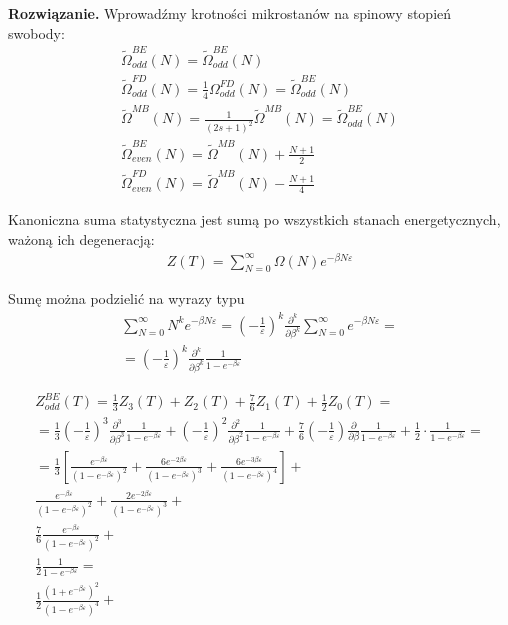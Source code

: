 \documentclass[11pt,a4paper]{article}
\newenvironment{solution}{\vspace{1cm} \par\textbf{Rozwiązanie.} \vspace{1cm}}{}
\begin{document}
\begin{solution}
Wprowadźmy krotności mikrostanów na spinowy stopień swobody:
\begin{align*}
\tilde{\Omega}_{odd}^{BE}(N) = \tilde{\Omega}_{odd}^{BE}(N) \\
\tilde{\Omega}_{odd}^{FD}(N) =  \frac{1}{4}\Omega_{odd}^{FD}(N) =  \tilde{\Omega}_{odd}^{BE}(N) \\
\tilde{\Omega}^{MB}(N) = \frac{1}{(2s+1)^2}\tilde{\Omega}^{MB}(N) = \tilde{\Omega}_{odd}^{BE}(N) \\
\tilde{\Omega}_{even}^{BE}(N) = \tilde{\Omega}^{MB}(N) + \frac{N+1}{2} \\
\tilde{\Omega}_{even}^{FD}(N) = \tilde{\Omega}^{MB}(N) - \frac{N+1}{4} 
\end{align*}

Kanoniczna suma statystyczna jest sumą po wszystkich stanach
energetycznych, ważoną ich degeneracją:
\begin{align*}
Z(T) = \sum_{N=0}^{\infty} \Omega(N) e^{-\beta N \varepsilon}
\end{align*}

Sumę można podzielić na wyrazy typu
\begin{align*}
\sum_{N=0}^{\infty} N^k e^{-\beta N \varepsilon} = 
\left(-\frac{1}{\varepsilon}\right)^k \frac{\partial^k}{\partial \beta^k} \sum_{N=0}^{\infty} e^{-\beta N \varepsilon} = \\
= \left(-\frac{1}{\varepsilon}\right)^k \frac{\partial^k}{\partial \beta^k} \frac{1}{1 - e^{-\beta \varepsilon}} 
\end{align*}


\begin{align*}
  Z_{odd}^{BE}(T) = \frac{1}{3}Z_{3}(T) + Z_{2}(T) + \frac{7}{6}Z_{1}(T) + \frac{1}{2}Z_{0}(T) = \\
  = \frac{1}{3} \left(-\frac{1}{\varepsilon}\right)^3 \frac{\partial^3}{\partial \beta^3} \frac{1}{1 - e^{-\beta \varepsilon}} + 
    \left(-\frac{1}{\varepsilon}\right)^2 \frac{\partial^2}{\partial \beta^2} \frac{1}{1 - e^{-\beta \varepsilon}} + 
    \frac{7}{6} \left(-\frac{1}{\varepsilon}\right) \frac{\partial}{\partial \beta} \frac{1}{1 - e^{-\beta \varepsilon}} + 
    \frac{1}{2} \cdot \frac{1}{1 - e^{-\beta \varepsilon}} = \\
  = \frac{1}{3} \left[
    \frac{e^{-\beta \varepsilon}}{(1 - e^{-\beta \varepsilon})^{2}} +
    \frac{6e^{-2\beta \varepsilon}}{(1 - e^{-\beta \varepsilon})^{3}} +
    \frac{6e^{-3\beta \varepsilon}}{(1 - e^{-\beta \varepsilon})^{4}}
    \right] + \\
    \frac{e^{-\beta \varepsilon}}{(1 - e^{-\beta \varepsilon})^{2}} +
    \frac{2e^{-2\beta \varepsilon}}{(1 - e^{-\beta \varepsilon})^{3}} + \\
    \frac{7}{6} \frac{e^{-\beta \varepsilon}}{(1 - e^{-\beta \varepsilon})^{2}} + \\
    \frac{1}{2} \frac{1}{1 - e^{-\beta \varepsilon}} = \\
    \frac{1}{2} \frac{(1 + e^{-\beta \varepsilon})^{2}}{(1 - e^{-\beta \varepsilon})^{4}} +
\end{align*}


\end{solution}
\end{document}
